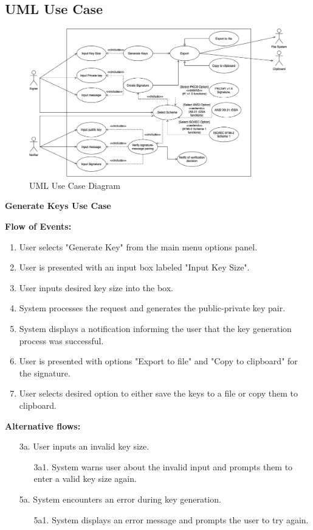 \documentclass[]{final_report}
\theoremstyle{definition}
\begin{document}
\subsection{UML Use Case}
\begin{figure}[H]
    \centering
    \includegraphics[scale=0.48]{POC_USE-CASE.png}
    \caption{UML Use Case Diagram}
    \label{fig:uc}
\end{figure}



\textbf{Generate Keys Use Case}

\noindent\textbf{Flow of Events:}
\begin{enumerate}
    \item User selects "Generate Key" from the main menu options panel.
    \item User is presented with an input box labeled "Input Key Size".
    \item User inputs desired key size into the box.
    \item System processes the request and generates the public-private key pair.
    \item System displays a notification informing the user that the key generation process was successful.
    \item User is presented with options "Export to file" and "Copy to clipboard" for the signature.
    \item User selects desired option to either save the keys to a file or copy them to clipboard.
\end{enumerate}

\noindent\textbf{Alternative flows:}
\begin{enumerate}
    \item[3a.] User inputs an invalid key size.
    \begin{enumerate}
        \item[3a1.] System warns user about the invalid input and prompts them to enter a valid key size again.
    \end{enumerate}
    \item[5a.] System encounters an error during key generation.
    \begin{enumerate}
        \item[5a1.] System displays an error message and prompts the user to try again.
    \end{enumerate}
     
\end{enumerate}
\end{document}
